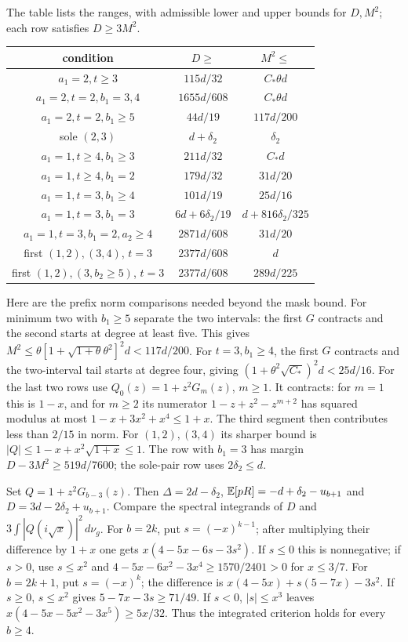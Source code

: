 The table lists the ranges, with admissible lower
and upper bounds for $D,M^2$; each row satisfies $D\ge3M^2$.
\begin{center}\small
\begin{tabular}{@{}ccc@{}}\toprule
condition&$D\ge$&$M^2\le$\\\midrule
$a_1=2,t\ge3$&$115d/32$&$C_*\theta d$\\
$a_1=2,t=2,b_1=3,4$&$1655d/608$&$C_*\theta d$\\
$a_1=2,t=2,b_1\ge5$&$44d/19$&$117d/200$\\
sole $(2,3)$&$d+\delta_{2}$&$\delta_{2}$\\
$a_1=1,t\ge4,b_1\ge3$&$211d/32$&$C_*d$\\
$a_1=1,t\ge4,b_1=2$&$179d/32$&$31d/20$\\
$a_1=1,t=3,b_1\ge4$&$101d/19$&$25d/16$\\
$a_1=1,t=3,b_1=3$&$6d+6\delta_{2}/19$&$d+816\delta_{2}/325$\\
$a_1=1,t=3,b_1=2,a_2\ge4$&$2871d/608$&$31d/20$\\
first $(1,2),(3,4)$, $t=3$&$2377d/608$&$d$\\
first $(1,2),(3,b_2\ge5)$, $t=3$&$2377d/608$&$289d/225$\\\bottomrule
\end{tabular}
\end{center}
Here are the prefix norm comparisons needed beyond the mask bound.
For minimum two with $b_1\ge5$ separate the two intervals: the first
$G$ contracts and the second starts at degree at least five. This gives
$M^2\le\theta[1+\sqrt{1+\theta}\theta^2]^2d<117d/200$.
For $t=3,b_1\ge4$, the first $G$ contracts and the two-interval tail
starts at degree four, giving $(1+\theta^2\sqrt{C_*})^2d<25d/16$.
For the last two rows use
$Q_0(z)=1+z^2G_m(z)$, $m\ge1$. It contracts: for $m=1$ this is
$1-x$, and for $m\ge2$ its numerator
$1-z+z^2-z^{m+2}$ has squared modulus at most
$1-x+3x^2+x^4\le1+x$.
The third segment then contributes less than $2/15$ in norm.
For $(1,2),(3,4)$ its sharper bound is
$|Q|\le1-x+x^2\sqrt{1+x}\le1$.
The row with $b_1=3$ has margin
$D-3M^2\ge519d/7600$; the sole-pair row uses $2\delta_{2}\le d$.

Set $Q=1+z^2G_{b-3}(z)$.
Then $\Delta=2d-\delta_{2}$, $\mathbb E[pR]=-d+\delta_{2}-u_{b+1}$ and
$D=3d-2\delta_{2}+u_{b+1}$. Compare the spectral integrands of $D$ and
$3\int|Q(i\sqrt x)|^2\,d\nu_g$.
For $b=2k$, put $s=(-x)^{k-1}$; after multiplying their difference by
$1+x$ one gets $x(4-5x-6s-3s^2)$.
If $s\le0$ this is nonnegative; if $s>0$, use $s\le x^2$ and
$4-5x-6x^2-3x^4\ge1570/2401>0$ for $x\le3/7$.
For $b=2k+1$, put $s=(-x)^k$; the difference is
$x(4-5x)+s(5-7x)-3s^2$.
If $s\ge0$, $s\le x^2$ gives $5-7x-3s\ge71/49$.
If $s<0$, $|s|\le x^3$ leaves
$x(4-5x-5x^2-3x^5)\ge5x/32$.
Thus the integrated criterion holds for every $b\ge4$.

